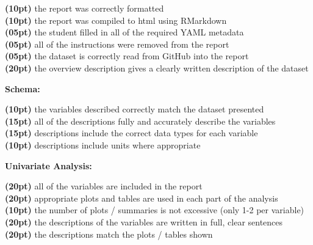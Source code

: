 \documentclass[12pt]{article}
\begin{document}
\underline{\hspace{1cm}} \textbf{(10pt)}
  the report was correctly formatted \\
\underline{\hspace{1cm}} \textbf{(10pt)}
  the report was compiled to html using RMarkdown \\
\underline{\hspace{1cm}} \textbf{(05pt)}
  the student filled in all of the required YAML metadata \\
\underline{\hspace{1cm}} \textbf{(05pt)}
  all of the instructions were removed from the report \\
\underline{\hspace{1cm}} \textbf{(05pt)}
  the dataset is correctly read from GitHub into the report \\
\underline{\hspace{1cm}} \textbf{(20pt)}
  the overview description gives a clearly written description
  of the dataset \\

\medskip

\textbf{Schema:} \vspace{6pt}

\underline{\hspace{1cm}} \textbf{(10pt)}
  the variables described correctly match the dataset presented \\
\underline{\hspace{1cm}} \textbf{(15pt)}
  all of the descriptions fully and accurately describe the variables \\
\underline{\hspace{1cm}} \textbf{(15pt)}
  descriptions include the correct data types for each variable \\
\underline{\hspace{1cm}} \textbf{(10pt)}
  descriptions include units where appropriate \\

\medskip

\textbf{Univariate Analysis:} \vspace{6pt}

\underline{\hspace{1cm}} \textbf{(20pt)}
  all of the variables are included in the report \\
\underline{\hspace{1cm}} \textbf{(20pt)}
  appropriate plots and tables are used in each part of the analysis \\
\underline{\hspace{1cm}} \textbf{(10pt)}
  the number of plots / summaries is not excessive (only 1-2 per variable) \\
\underline{\hspace{1cm}} \textbf{(20pt)}
  the descriptions of the variables are written in full, clear sentences \\
\underline{\hspace{1cm}} \textbf{(20pt)}
  the descriptions match the plots / tables shown \\
\end{document}
